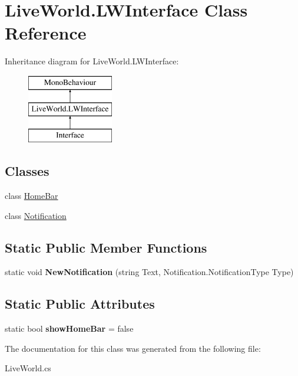 \hypertarget{class_live_world_1_1_l_w_interface}{}\section{Live\+World.\+L\+W\+Interface Class Reference}
\label{class_live_world_1_1_l_w_interface}
Inheritance diagram for Live\+World.\+L\+W\+Interface\+:\begin{figure}[H]
\begin{center}
\leavevmode
\includegraphics[height=3.000000cm]{class_live_world_1_1_l_w_interface}
\end{center}
\end{figure}
\subsection*{Classes}
\begin{DoxyCompactItemize}
\item 
class \hyperlink{class_live_world_1_1_l_w_interface_1_1_home_bar}{Home\+Bar}
\item 
class \hyperlink{class_live_world_1_1_l_w_interface_1_1_notification}{Notification}
\end{DoxyCompactItemize}
\subsection*{Static Public Member Functions}
\begin{DoxyCompactItemize}
\item 
\hypertarget{class_live_world_1_1_l_w_interface_a8689c4fab2a09c5d408e395ef92514ac}{}static void {\bfseries New\+Notification} (string Text, Notification.\+Notification\+Type Type)\label{class_live_world_1_1_l_w_interface_a8689c4fab2a09c5d408e395ef92514ac}

\end{DoxyCompactItemize}
\subsection*{Static Public Attributes}
\begin{DoxyCompactItemize}
\item 
\hypertarget{class_live_world_1_1_l_w_interface_a38a2ba545f99f8237cd0059c5403e87c}{}static bool {\bfseries show\+Home\+Bar} = false\label{class_live_world_1_1_l_w_interface_a38a2ba545f99f8237cd0059c5403e87c}

\end{DoxyCompactItemize}


The documentation for this class was generated from the following file\+:\begin{DoxyCompactItemize}
\item 
Live\+World.\+cs\end{DoxyCompactItemize}
